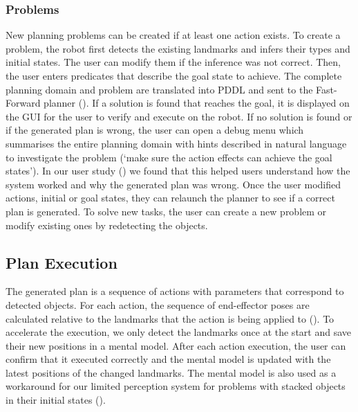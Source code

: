\subsubsection{Problems} New planning problems can be created if at least one action exists.
To create a problem, the robot first detects the existing landmarks and infers their types and initial states.
The user can modify them if the inference was not correct.
Then, the user enters predicates that describe the goal state to achieve.
The complete planning domain and problem are translated into PDDL and sent to the Fast-Forward planner (\cite{hoffmann2001ff}).
If a solution is found that reaches the goal, it is displayed on the GUI for the user to verify and execute on the robot.
If no solution is found or if the generated plan is wrong, the user can open a debug menu which summarises the entire planning domain with hints described in natural language to investigate the problem (\eg `make sure the action effects can achieve the goal states').
In our user study () we found that this helped users understand how the system worked and why the generated plan was wrong.
Once the user modified actions, initial or goal states, they can relaunch the planner to see if a correct plan is generated.
To solve new tasks, the user can create a new problem or modify existing ones by redetecting the objects.


\subsection{Plan Execution} 
The generated plan is a sequence of actions with parameters that correspond to detected objects.
For each action, the sequence of end-effector poses are calculated relative to the landmarks that the action is being applied to ().
To accelerate the execution, we only detect the landmarks once at the start and save their new positions in a mental model.
After each action execution, the user can confirm that it executed correctly and the mental model is updated with the latest positions of the changed landmarks.
The mental model is also used as a workaround for our limited perception system for problems with stacked objects in their initial states ().


